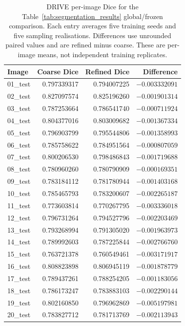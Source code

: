 \documentclass[jimaging,article,submit,pdftex,moreauthors]
  {Definitions/mdpi}
\begin{document}
\begin{table}[htbp]
\centering
\caption{DRIVE per-image Dice for the Table~\ref{tab:segmentation_results} global/frozen comparison. Each entry averages five training seeds and five sampling realisations. Differences use unrounded paired values and are refined minus coarse. These are per-image means, not independent training replicates.}
\label{tab:paired_per_image_drive}
\small
\begin{tabular}{lrrr}
\toprule
Image & Coarse Dice & Refined Dice & Difference \\
\midrule
01\_test & 0.797339317 & 0.794007225 & $-0.003332091$ \\
02\_test & 0.827097574 & 0.825196260 & $-0.001901314$ \\
03\_test & 0.787253664 & 0.786541740 & $-0.000711924$ \\
04\_test & 0.804377016 & 0.803009682 & $-0.001367334$ \\
05\_test & 0.796903799 & 0.795544806 & $-0.001358993$ \\
06\_test & 0.785758622 & 0.784951564 & $-0.000807059$ \\
07\_test & 0.800206530 & 0.798486843 & $-0.001719688$ \\
08\_test & 0.780960260 & 0.780790909 & $-0.000169351$ \\
09\_test & 0.783184112 & 0.781780944 & $-0.001403168$ \\
10\_test & 0.785465793 & 0.783200607 & $-0.002265187$ \\
11\_test & 0.773603814 & 0.770267795 & $-0.003336018$ \\
12\_test & 0.796731264 & 0.794527796 & $-0.002203469$ \\
13\_test & 0.793268994 & 0.791305020 & $-0.001963973$ \\
14\_test & 0.789992603 & 0.787225844 & $-0.002766760$ \\
15\_test & 0.763721378 & 0.760549461 & $-0.003171917$ \\
16\_test & 0.808823898 & 0.806945119 & $-0.001878779$ \\
17\_test & 0.789437261 & 0.788254205 & $-0.001183056$ \\
18\_test & 0.786173247 & 0.783883103 & $-0.002290144$ \\
19\_test & 0.802160850 & 0.796962869 & $-0.005197981$ \\
20\_test & 0.783827712 & 0.781713769 & $-0.002113943$ \\
\bottomrule
\end{tabular}
\end{table}
\end{document}
